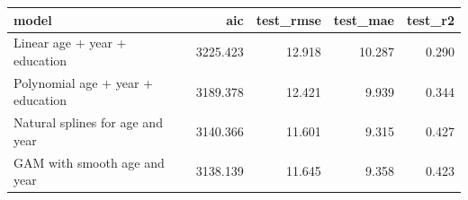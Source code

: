 
\begin{tabular}{lrrrr}
\toprule
model & aic & test\_rmse & test\_mae & test\_r2\\
\midrule
Linear age + year + education & 3225.423 & 12.918 & 10.287 & 0.290\\
Polynomial age + year + education & 3189.378 & 12.421 & 9.939 & 0.344\\
Natural splines for age and year & 3140.366 & 11.601 & 9.315 & 0.427\\
GAM with smooth age and year & 3138.139 & 11.645 & 9.358 & 0.423\\
\bottomrule
\end{tabular}
